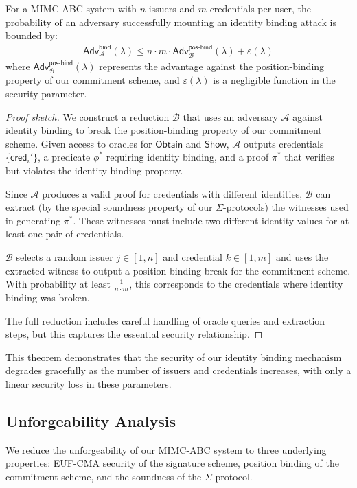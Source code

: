 \begin{theorem}
\label{thm:security-scaling}
For a MIMC-ABC system with $n$ issuers and $m$ credentials per user, the probability of an adversary successfully mounting an identity binding attack is bounded by:
\begin{align*}
\mathsf{Adv}^{\mathsf{bind}}_{\mathcal{A}}(\lambda) \leq n \cdot m \cdot \mathsf{Adv}^{\mathsf{pos\text{-}bind}}_{\mathcal{B}}(\lambda) + \varepsilon(\lambda)
\end{align*}
where $\mathsf{Adv}^{\mathsf{pos\text{-}bind}}_{\mathcal{B}}(\lambda)$ represents the advantage against the position-binding property of our commitment scheme, and $\varepsilon(\lambda)$ is a negligible function in the security parameter.
\end{theorem}

\begin{proof}[Proof sketch]
We construct a reduction $\mathcal{B}$ that uses an adversary $\mathcal{A}$ against identity binding to break the position-binding property of our commitment scheme. Given access to oracles for $\mathsf{Obtain}$ and $\mathsf{Show}$, $\mathcal{A}$ outputs credentials $\{\mathsf{cred}_i'\}$, a predicate $\phi^*$ requiring identity binding, and a proof $\pi^*$ that verifies but violates the identity binding property.

Since $\mathcal{A}$ produces a valid proof for credentials with different identities, $\mathcal{B}$ can extract (by the special soundness property of our $\Sigma$-protocols) the witnesses used in generating $\pi^*$. These witnesses must include two different identity values for at least one pair of credentials. 

$\mathcal{B}$ selects a random issuer $j \in [1,n]$ and credential $k \in [1,m]$ and uses the extracted witness to output a position-binding break for the commitment scheme. With probability at least $\frac{1}{n \cdot m}$, this corresponds to the credentials where identity binding was broken.

The full reduction includes careful handling of oracle queries and extraction steps, but this captures the essential security relationship.
\end{proof}

This theorem demonstrates that the security of our identity binding mechanism degrades gracefully as the number of issuers and credentials increases, with only a linear security loss in these parameters.

\subsection{Unforgeability Analysis}
We reduce the unforgeability of our MIMC-ABC system to three underlying properties: EUF-CMA security of the signature scheme, position binding of the commitment scheme, and the soundness of the $\Sigma$-protocol.

